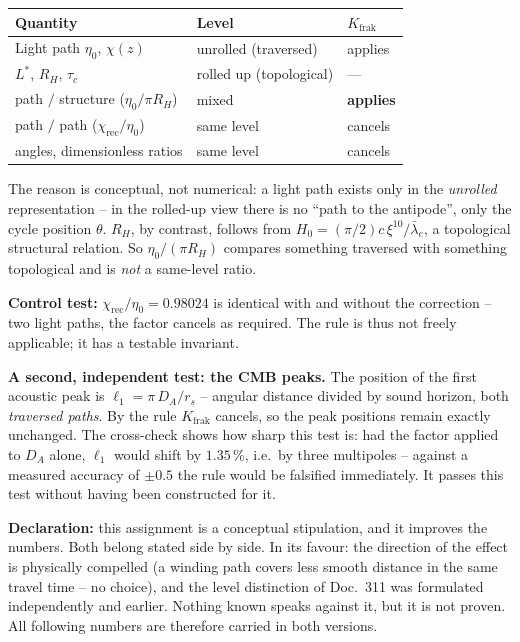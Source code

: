 \documentclass[11pt]{report}
\begin{document}
\begin{center}
\begin{tabular}{lll}
\toprule
Quantity & Level & $K_\text{frak}$ \\
\midrule
Light path $\eta_0$, $\chi(z)$ & unrolled (traversed) & applies \\
$L^{*}$, $R_H$, $\tau_c$ & rolled up (topological) & --- \\
path $/$ structure ($\eta_0/\pi R_H$) & mixed & \textbf{applies} \\
path $/$ path ($\chi_\text{rec}/\eta_0$) & same level & cancels \\
angles, dimensionless ratios & same level & cancels \\
\bottomrule
\end{tabular}
\end{center}

The reason is conceptual, not numerical: a light path exists only
in the \emph{unrolled} representation -- in the rolled-up view
there is no \enquote{path to the antipode}, only the cycle
position $\theta$. $R_H$, by contrast, follows from
$H_0 = (\pi/2)c\,\xi^{10}/\bar\lambda_e$, a topological
structural relation. So $\eta_0/(\pi R_H)$ compares something
traversed with something topological and is \emph{not} a
same-level ratio.

\textbf{Control test:} $\chi_\text{rec}/\eta_0 = 0.98024$ is
identical with and without the correction -- two light paths, the
factor cancels as required. The rule is thus not freely
applicable; it has a testable invariant.

\textbf{A second, independent test: the CMB peaks.} The position
of the first acoustic peak is $\ell_1 = \pi\,D_A/r_s$ -- angular
distance divided by sound horizon, both \emph{traversed paths}.
By the rule $K_\text{frak}$ cancels, so the peak positions remain
exactly unchanged. The cross-check shows how sharp this test is:
had the factor applied to $D_A$ alone, $\ell_1$ would shift by
$1.35\,\%$, i.e.\ by three multipoles -- against a measured
accuracy of $\pm0.5$ the rule would be falsified immediately. It
passes this test without having been constructed for it.

\textbf{Declaration:} this assignment is a conceptual
stipulation, and it improves the numbers. Both belong stated side
by side. In its favour: the direction of the effect is physically
compelled (a winding path covers less smooth distance in the same
travel time -- no choice), and the level distinction of Doc.~311
was formulated independently and earlier. Nothing known speaks
against it, but it is not proven. All following numbers are
therefore carried in both versions.
\end{document}

